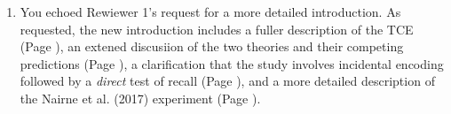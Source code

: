 \documentclass[12pt]{article}
\begin{document}
\begin{enumerate}

\item
	You echoed Rewiewer 1's request for a more detailed introduction. As requested, the new introduction includes a fuller description of the TCE (Page \pageref{TODO-1}), %
	an extened discusiion of the two theories and their competing predictions (Page \pageref{TODO-2}),
	a clarification that the study involves incidental encoding followed by a \emph{direct} test of recall (Page  \pageref{TODO-3}),
	and a more detailed description of the Nairne et al. (2017) experiment (Page \pageref{TODO-4}).


\end{enumerate}
\end{document}
